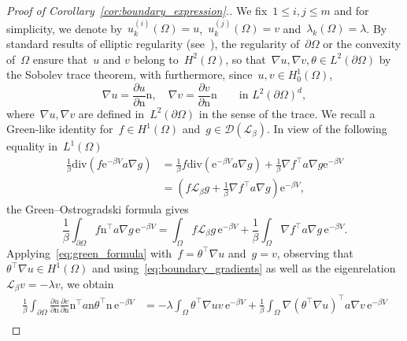 \documentclass[a4]{article}
\newcommand{\cL}{\mathcal{L}}
\newcommand{\e}{\mathrm{e}}
\renewcommand{\div}{\mathrm{div}}
\newcommand{\n}{\mathrm{n}}
\newcommand{\1}{\mathbbm 1}
\begin{document}
\begin{proof}[Proof of Corollary~\ref{cor:boundary_expression}.]
    We fix~$1\leq i,j\leq m$ and for simplicity, we denote by~$u_k^{(i)}(\Omega)=u$,~$u_k^{(j)}(\Omega)=v$ and~$\lambda_k(\Omega)=\lambda$. By standard results of elliptic regularity (see~\cite[Theorems 2.4.2.5 and~3.2.1.3]{G11}), the regularity of~$\partial\Omega$ or the convexity of~$\Omega$ ensure that~$u$ and $v$ belong to~$H^2(\Omega)$, so that~$\nabla u,\nabla v,\theta \in L^2(\partial\Omega)$ by the Sobolev trace theorem,
    with furthermore, since~$u,v\in H_0^1(\Omega)$,
    \begin{equation}
        \label{eq:boundary_gradients}
        \nabla u = \frac{\partial u}{\partial \n}\n,\quad \nabla v = \frac{\partial v}{\partial\n}\n\qquad \text{in } L^2(\partial\Omega)^d,
    \end{equation}
    where~$\nabla u,\nabla v$ are defined in~$L^2(\partial\Omega)$ in the sense of the trace.
    We recall a Green-like identity for~$f\in H^1(\Omega)$ and~$g\in\mathcal D(\cL_\beta)$. In view of the following equality in~$L^1(\Omega)$
    \begin{equation}
        \begin{aligned}
            \frac1\beta\div\left(f\e^{-\beta V}a\nabla g\right) &= \frac1\beta f\div\left(\e^{-\beta V}a\nabla g\right) + \frac1\beta \nabla f^\top a \nabla g\e^{-\beta V}\\
            &= \left(f\cL_\beta g + \frac1\beta\nabla f^\top a \nabla g\right)\e^{-\beta V},
        \end{aligned}
    \end{equation}
    the Green--Ostrogradski formula gives
    \begin{equation}
        \label{eq:green_formula}
        \frac1\beta\int_{\partial \Omega} f\n^\top a\nabla g\,\e^{-\beta V} = \int_{\Omega}f\cL_\beta g\,\e^{-\beta V} + \frac1\beta\int_\Omega\nabla f^\top a \nabla g\,\e^{-\beta V}.
    \end{equation}
    Applying~\eqref{eq:green_formula} with~$f=\theta^\top \nabla u$ and~$g=v$, observing that~$\theta^\top\nabla u\in H^1(\Omega)$ and using~\eqref{eq:boundary_gradients} as well as the eigenrelation~$\cL_\beta v = -\lambda v$, we obtain
    \begin{equation}
        \begin{aligned}
        \frac1\beta\int_{\partial\Omega}\frac{\partial u}{\partial \n}\frac{\partial v}{\partial\n}\n^\top a\n \theta^\top\n\,\e^{-\beta V} &= -\lambda\int_{\Omega}\theta^\top\nabla u v\,\e^{-\beta V} + \frac1\beta\int_{\Omega}\nabla\left(\theta^\top\nabla u\right)^\top a \nabla v\,\e^{-\beta V}\\

\end{aligned}
\end{equation}
\end{proof}
\end{document}
